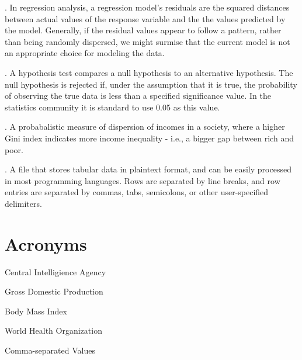 \documentclass[oneside,12pt]{report}
\begin{document}
\vspace{8pt} . In regression analysis, a regression model's residuals are the squared distances between actual values of the response variable and the the values predicted by the model. Generally, if the residual values appear to follow a pattern, rather than being randomly dispersed, we might surmise that the current model is not an appropriate choice for modeling the data.

\vspace{8pt} . A hypothesis test compares a null hypothesis to an alternative hypothesis. The null hypothesis is rejected if, under the assumption that it is true, the probability of observing the true data is less than a specified significance value. In the statistics community it is standard to use 0.05 as this value.

\vspace{8pt} . A probabalistic measure of dispersion of incomes in a society, where a higher Gini index indicates more income inequality - i.e., a bigger gap between rich and poor.

\vspace{8pt} . A file that stores tabular data in plaintext format, and can be easily processed in most programming languages. Rows are separated by line breaks, and row entries are separated by commas, tabs, semicolons, or other user-specified delimiters.


\chapter{Acronyms}\label{Acronyms}

 Central Intelligience Agency
\vspace{5pt}

 Gross Domestic Production

\vspace{5pt}

 Body Mass Index

\vspace{5pt}

 World Health Organization

\vspace{5pt}

 Comma-separated Values
\end{document}
